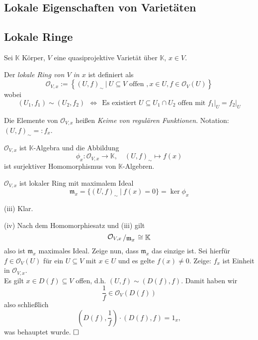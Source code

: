 \documentclass[11pt]{book}
\theoremstyle{nonumberbreak}
\newenvironment{pr}[1][]{\ifthenelse{\equal{#1}{}}{\proof}{\proof[#1]}\rm}{\endproof}
\newenvironment{definbem}[1][]{\ifthenelse{\equal{#1}{}}{\definibem}{\definibem[#1]}\rm}{\enddefinibem}
\newcommand{\slant}[2]{{\raisebox{.1em}{$#1$}\left/\raisebox{-.1em}{$#2$}\right.}}
\begin{document}
\begin{spacing}{1.3}


\chapter{Lokale Eigenschaften von Varietäten}


\setcounter{section}{11}

\renewcommand*\thesection{§ \arabic{section}\quad}
\section{Lokale Ringe} %
\renewcommand*\thesection{\arabic{section}}


\begin{definbem} %

Sei $\mathbb{K}$ Körper, $V$ eine quasiprojektive Varietät über $\mathbb{K}$, $x \in V$.
\begin{compactenum}
\item Der \textit{lokale Ring von $V$ in $x$} ist definiert als
$$\mathcal{O}_{V,x}:= \left\{ (U,f)_{\sim} \ \big\vert \ U \subseteq V \textrm{ offen }, x \in U, f \in \mathcal{O}_V(U) \right\}$$
wobei
$$(U_1, f_1) \sim (U_2, f_2) \ \ \Longleftrightarrow \ \ \textrm{Es existiert } U \subseteq U_1 \cap U_2 \textrm{ offen mit } f_1 \vert_U = f_2 \vert_U$$
\item Die Elemente von $\mathcal{O}_{V,x}$ heißen \textit{Keime von regulären Funktionen}. Notation: $(U,f)_{\sim} =: f_x$.
\item $\mathcal{O}_{V,x}$ ist $\mathbb{K}$-Algebra und die Abbildung
$$\phi_x: \mathcal{O}_{V,x} \longrightarrow \mathbb{K}, \quad (U,f)_{\sim} \mapsto f(x)$$
ist surjektiver Homomorphismus von $\mathbb{K}$-Algebren.
\item $\mathcal{O}_{V,x}$ ist lokaler Ring mit maximalem Ideal
$$\mathfrak{m}_x = \{ (U,f)_{\sim} \ \vert \ f(x)=0 \} = \ker\phi_x$$
\end{compactenum}
\begin{pr}
\begin{compactenum}
\item[(iii)] Klar.
\item[(iv)] Nach dem Homomorphiesatz und (iii) gilt
$$\slant{\mathcal{O}_{V,x}}{\mathfrak{m}_x} \cong \mathbb{K}$$
also ist $\mathfrak{m}_x$ maximales Ideal. Zeige nun, dass $\mathfrak{m}_x$ das einzige ist. Sei hierfür $f \in \mathcal{O}_V(U)$ für ein $U \subseteq V$ mit $x \in U$ und es gelte $f(x)\neq0$. Zeige: $f_x$ ist Einheit in $\mathcal{O}_{V,x}$.\\
Es gilt $x \in D(f) \subseteq V$ offen, d.h. $(U,f) \sim (D(f), f)$. Damit haben wir 
$$\frac{1}{f} \in \mathcal{O}_V(D(f))$$
also schließlich
$$\left(D(f), \frac{1}{f} \right) \cdot \left( D(f), f \right) = 1_x,$$
was behauptet wurde. $\hfill \Box$
\end{compactenum}
\end{pr}
\end{definbem}


\end{spacing}
\end{document}
